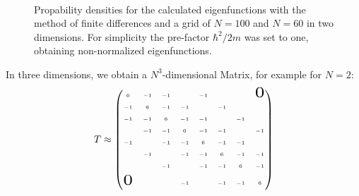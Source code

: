 \documentclass[twoside,        %
			   12pt,			%
               BCOR10mm,       %
               ngerman,english  %
               ]{scrartcl}
\begin{document}
\begin{figure}[!htb]
	\Huge
	\hspace*{-1.5in}
	\centering
	\subfigure[Color map, $\psi_{12}$, $N=60$.]
		{\resizebox{!}{0.28\textwidth}{}\label{fig:2d_eigenfunction}}
	\\
	\caption{Propability densities for the calculated eigenfunctions with the method of finite differences and a grid of $N=100$ and $N=60$ in two dimensions. For simplicity the pre-factor $\hbar^2 /2m$ was set to one, obtaining non-normalized eigenfunctions.}
	\label{Aufbauskizze}
\end{figure}



In three dimensions, we obtain a $N^3$-dimensional Matrix, for example for $N=2$:
\begin{align*}
T \approx
\tiny
\begin{pmatrix}
 6 & -1 & -1 &  & -1 &  &  & \scalebox{3}{$0$}  \\\\
   -1 & 6 & -1 & -1 &  & -1 &  & \\\\
     -1 & -1 & 6 & -1 & -1 &  & -1 & \\\\
        & -1 & -1 & 6 & -1 & -1 &  & -1\\\\
        -1 &  & -1 & -1 & 6 & -1 & -1 & \\\\
           & -1 &  & -1 & -1 & 6 & -1 & -1\\\\
             &  & -1 &  & -1 & -1 & 6 & -1\\\\
              \scalebox{3}{$0$}  &  &  & -1 &  & -1 & -1 & 6\\\\
              \end{pmatrix}
\end{align*}
\end{document}
